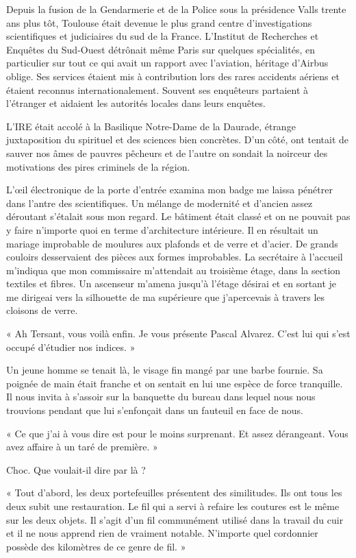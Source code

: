 Depuis la fusion de la Gendarmerie et de la Police sous la présidence Valls trente ans plus tôt, Toulouse était devenue 
le plus grand centre d'investigations scientifiques et judiciaires du sud de la France. L'Institut de Recherches et 
Enquêtes du Sud-Ouest détrônait même Paris sur quelques spécialités, en particulier sur tout ce qui avait un rapport 
avec l'aviation, héritage d'Airbus oblige. Ses services étaient mis à contribution lors des rares accidents aériens et 
étaient reconnus internationalement. Souvent ses enquêteurs partaient à l'étranger et aidaient les autorités locales 
dans leurs enquêtes.

L'IRE était accolé à la Basilique Notre-Dame de la Daurade, étrange juxtaposition du spirituel et des sciences bien 
concrètes. D'un côté, ont tentait de sauver nos âmes de pauvres pêcheurs et de l'autre on sondait la noirceur des 
motivations des pires criminels de la région.

L'œil électronique de la porte d'entrée examina mon badge me laissa pénétrer dans l'antre des scientifiques. Un mélange 
de modernité et d'ancien assez déroutant s'étalait sous mon regard. Le bâtiment était classé et on ne pouvait pas y 
faire n'importe quoi en terme d'architecture intérieure. Il en résultait un mariage improbable de moulures aux plafonds 
et de verre et d'acier. De grands couloirs desservaient des pièces aux formes improbables. La secrétaire à l'accueil 
m'indiqua que mon commissaire m'attendait au troisième étage, dans la section textiles et fibres. Un ascenseur m'amena 
jusqu'à l'étage désirai et en sortant je me dirigeai vers la silhouette de ma supérieure que j'apercevais à travers les 
cloisons de verre.

« Ah Tersant, vous voilà enfin. Je vous présente Pascal Alvarez. C'est lui qui s'est occupé d'étudier nos indices. »

Un jeune homme se tenait là, le visage fin mangé par une barbe fournie. Sa poignée de main était franche et on sentait 
en lui une espèce de force tranquille. Il nous invita à s'assoir sur la banquette du bureau dans lequel nous 
nous trouvions pendant que lui s'enfonçait dans un fauteuil en face de nous.

« Ce que j'ai à vous dire est pour le moins surprenant. Et assez dérangeant. Vous avez affaire à un taré de première. »

Choc. Que voulait-il dire par là ?

« Tout d'abord, les deux portefeuilles présentent des similitudes. Ils ont tous les deux subit une restauration. Le fil 
qui a servi à refaire les coutures est le même sur les deux objets. Il s'agit d'un fil communément utilisé dans la 
travail du cuir et il ne nous apprend rien de vraiment notable. N'importe quel cordonnier possède des kilomètres de ce 
genre de fil. »

